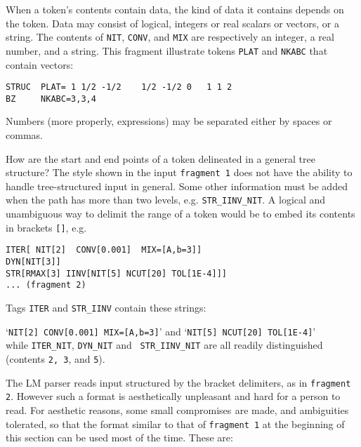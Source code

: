 \documentclass{article}
\begin{document}
\vskip 6pt\noindent When a token's contents contain data, the kind of data
it contains depends on the token.  Data may consist of logical, integers or
real scalars or vectors, or a string. The contents of {\tt{}NIT},
{\tt{}CONV}, and {\tt{}MIX} are respectively an integer, a real number, and
a string.  This fragment illustrate tokens {\tt{}PLAT} and {\tt{}NKABC} that
contain vectors:
\begin{verbatim}
STRUC  PLAT= 1 1/2 -1/2    1/2 -1/2 0   1 1 2
BZ     NKABC=3,3,4
\end{verbatim}
Numbers (more properly, expressions) may be separated either by spaces or
commas.

\vskip 6pt\noindent How are the start and end points of a token delineated
in a general tree structure?  The style shown in the input {\tt{}fragment 1} does
not have the ability to handle tree-structured input in general.  Some
other information must be added when the path has more than two levels,
e.g. {\tt STR\_IINV\_NIT}.  A logical and unambiguous way to delimit the
range of a token would be to embed its contents in brackets {\tt []}, e.g.
\begin{verbatim}
ITER[ NIT[2]  CONV[0.001]  MIX=[A,b=3]]
DYN[NIT[3]]
STR[RMAX[3] IINV[NIT[5] NCUT[20] TOL[1E-4]]]
... (fragment 2)
\end{verbatim}
Tags {\tt ITER} and {\tt STR\_IINV} contain these strings:

`{\tt NIT[2]  CONV[0.001]  MIX=[A,b=3]}' \quad and \quad `{\tt NIT[5] NCUT[20] TOL[1E-4]}'\\
while {\tt ITER\_NIT}, {\tt DYN\_NIT} and {\tt
STR\_IINV\_NIT} are all readily distinguished (contents {\tt 2, 3}, and
{\tt 5}).

%

\vskip 6pt\noindent
The LM parser reads input structured by the bracket delimiters, as in
{\tt{}fragment 2}. However such a format is aesthetically unpleasant and
hard for a person to read.  For aesthetic reasons, some small compromises
$^{}$are made, and ambiguities tolerated, so that the format similar to
that of {\tt fragment 1} at the beginning of this section can be used most
of the time.  These are:
\end{document}
